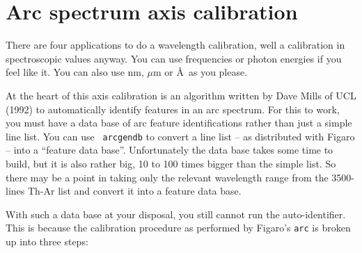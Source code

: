\goodbreak
\section{Arc spectrum axis calibration}
\label{axcalib}

There are four applications to do a wavelength calibration, well a
calibration in spectroscopic values anyway.  You can use frequencies or
photon energies if you feel like it.  You can also use nm, $\mu$m or
\AA\ as you please.

At the heart of this axis calibration is an algorithm written by Dave
Mills of UCL (1992) to automatically identify features in an arc
spectrum.  For this to work, you must have a data base of arc feature
identifications rather than just a simple line list.  You can use {\tt
arcgendb} to convert a line list -- as distributed with Figaro -- into a
``feature data base''.  Unfortunately the data base takes some time to
build, but it is also rather big, 10 to 100 times bigger than the simple
list.  So there may be a point in taking only the relevant wavelength
range from the 3500-lines Th-Ar list and convert it into a feature data
base.

With such a data base at your disposal, you still cannot run the
auto-identifier.  This is because the calibration procedure as performed
by Figaro's {\tt arc} is broken up into three steps:

